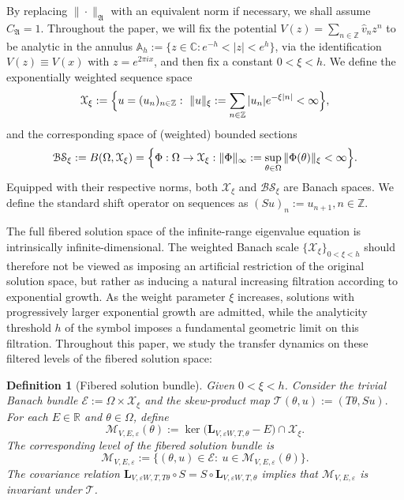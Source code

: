 \documentclass[reqno,11pt]{amsart}
\newtheorem{definition}{Definition}[section]
\newcommand{\Z}{{\mathbb Z}}
\newcommand{\R}{{\mathbb R}}
\begin{document}
By replacing $\|\cdot\|_{\mathfrak A}$ with an equivalent norm if necessary, we shall
assume  $C_{\mathfrak A}=1.$  
Throughout the paper, we  will fix the potential  $V(z)=\sum_{n\in\Z} \widehat v_n z^n $ to be analytic in the annulus $\mathbb A_h := \{z\in\mathbb C: e^{-h} < |z| < e^h\}$, via the identification $V(z) \equiv V(x)$ with $z = e^{2\pi i x}$, and then fix a constant $0 < \xi < h$. We define the exponentially weighted sequence space
$$
\mathcal{X}_{\xi}:=\Bigl\{u=(u_n)_{n\in\Z}:\ 
\|u\|_\xi:=\sum_{n\in\Z}|u_n|e^{-\xi|n|}<\infty\Bigr\},
$$
and the corresponding space of (weighted) bounded sections
$$
\mathcal{BS}_\xi := B(\Omega, \mathcal{X}_{\xi}) = \Bigl\{ \Phi:\Omega \to \mathcal{X}_{\xi} : \|\Phi\|_\infty := \sup_{\theta\in\Omega} \|\Phi(\theta)\|_\xi < \infty \Bigr\}.
$$
Equipped with their respective norms, both $\mathcal{X}_{\xi}$ and $\mathcal{BS}_\xi$ are Banach spaces. We define the standard shift operator on sequences as
$
(Su)_n := u_{n+1},  n\in\Z.
$

The full fibered solution space of the infinite-range eigenvalue equation is intrinsically infinite-dimensional. The weighted Banach scale
$\{ \mathcal{X}_\xi \}_{0 < \xi < h}$
should therefore not be viewed as imposing an artificial restriction of the original solution space, but rather as inducing a natural increasing filtration according to exponential growth. As the weight parameter $\xi$ increases, solutions with progressively larger exponential growth are admitted, while the analyticity threshold $h$ of the symbol imposes a fundamental geometric limit on this filtration. Throughout this paper, we study the transfer dynamics on these filtered levels of the fibered solution space:




\begin{definition}[Fibered solution bundle]
\label{def:solution-space}
Given $0<\xi<h$. Consider the trivial Banach bundle $\mathcal E:=\Omega\times\mathcal X_\xi$ and the skew-product map
$\mathscr T(\theta,u):=(T\theta,Su).$
For each $E\in\R$ and $\theta\in\Omega$, define
$$
\mathcal M_{V,E,\varepsilon}(\theta):=
\ker\bigl(\mathbf L_{V,\varepsilon W,T,\theta}-E\bigr)
\cap \mathcal X_\xi.
$$
The corresponding level of the fibered solution bundle is
$$
\boldsymbol{\mathcal M}_{V,E,\varepsilon}:=\bigl\{
(\theta,u)\in\mathcal E:\ u\in\mathcal M_{V,E,\varepsilon}(\theta)
\bigr\}.
$$
The covariance relation
$\mathbf L_{V,\varepsilon W,T,T\theta}\circ S=S\circ \mathbf L_{V,\varepsilon W,T,\theta}$
implies that $\boldsymbol{\mathcal M}_{V,E,\varepsilon}$ is invariant under $\mathscr T$.
\end{definition}
\end{document}
